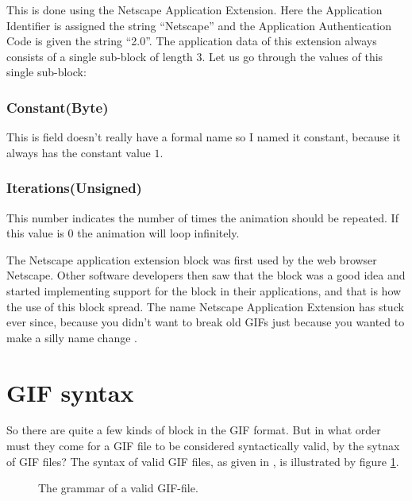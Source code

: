 This is done using the Netscape Application Extension. Here the
Application Identifier is assigned the string ``Netscape'' and the
Application Authentication Code is given the string ``2.0''. The
application data of this extension always consists of a single
sub-block of length 3. Let us go through the values of this single
sub-block: \cite{frazier97:_all_about_gif89}

\subsubsection{Constant(Byte)}

This is field doesn't really have a formal name so I named it
constant, because it always has the constant value $1$.

\subsubsection{Iterations(Unsigned)}

This number indicates the number of times the animation should be
repeated. If this value is $0$ the animation will loop infinitely.

The Netscape application extension block was first used by the web
browser Netscape. Other software developers then saw that the block
was a good idea and started implementing support for the block in
their applications, and that is how the use of this block spread. The
name Netscape Application Extension has stuck ever since, because you
didn't want to break old GIFs just because you wanted to make a silly
name change \cite{walte96:_web_scrip_secret_weapon}.

\section{GIF syntax}
\label{sec:gif-syntax}
So there are quite a few kinds of block in the GIF format. But in what
order must they come for a GIF file to be considered syntactically
valid, by the sytnax of GIF files? The syntax of valid GIF files, as
given in \cite{gif89a}, is illustrated by figure
\ref{fig:gif-grammar}.

\begin{figure}
  \centering


  \caption{The grammar of a valid GIF-file.}
  \label{fig:gif-grammar}
\end{figure}

